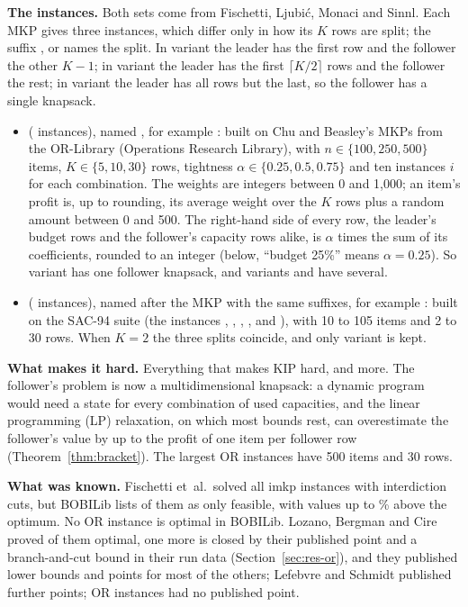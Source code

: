 \textbf{The instances.} Both sets come from Fischetti, Ljubi\'c, Monaci and
Sinnl.\cite{fischetti2019interdiction} Each MKP gives three instances, which differ only in how
its $K$ rows are split; the suffix ,  or  names the split. In
variant  the leader has the first row and the follower the other $K-1$; in variant
 the leader has the first $\lceil K/2\rceil$ rows and the follower the rest; in variant
 the leader has all rows but the last, so the follower has a single knapsack.
\begin{itemize}\setlength{\emergencystretch}{3em}
\item {} (\NumOr{} instances), named , for example
: built on Chu and Beasley's MKPs from the OR-Library (Operations
Research Library),\cite{chu1998genetic,beasley1990orlibrary} with $n\in\{100,250,500\}$ items,
$K\in\{5,10,30\}$ rows, tightness $\alpha\in\{0.25,0.5,0.75\}$ and ten instances $i$ for each
combination. The weights are integers between 0 and 1,000; an item's profit is, up to
rounding, its average weight over the $K$ rows plus a random amount between 0 and 500. The
right-hand side of every row, the leader's budget rows and the follower's capacity rows alike,
is $\alpha$ times the sum of its coefficients, rounded to an integer (below, ``budget 25\%'' means $\alpha=0.25$). So variant
 has one follower knapsack, and variants  and  have several.
\item {} (\NumImkp{} instances), named after the MKP with the same suffixes, for example
: built on the SAC-94 suite\cite{khuri1994zero} (the instances
, , , ,  and ), with 10 to 105
items and 2 to 30 rows. When $K=2$ the three splits coincide, and only variant  is kept.
\end{itemize}

\textbf{What makes it hard.} Everything that makes KIP hard, and more. The follower's problem is
now a multidimensional knapsack: a dynamic program would need a state for every combination of
used capacities, and the linear programming (LP) relaxation, on which most bounds rest, can
overestimate the follower's value by up to the profit of one item per follower row
(Theorem~\ref{thm:bracket}). The largest OR instances have 500 items and 30 rows.

\textbf{What was known.} Fischetti et~al.\ solved all \NumImkp{} imkp instances with
interdiction cuts, but BOBILib lists \NumLitImkp{} of them as only feasible, with values up to
\ImkpBobiExcessMax\% above the optimum. No OR instance is optimal in BOBILib. Lozano, Bergman and
Cire\cite{lozano2026network} proved \NumLitOrClaimed{} of them optimal, one more is closed by their
published point and a branch-and-cut bound in their run data (Section~\ref{sec:res-or}), and they
published lower bounds and points for most of the others;\cite{lozano_dbo_repo} Lefebvre and
Schmidt\cite{lefebvre2025dantzig} published further points; \NumOrNoPublished{} OR instances had
no published point.

